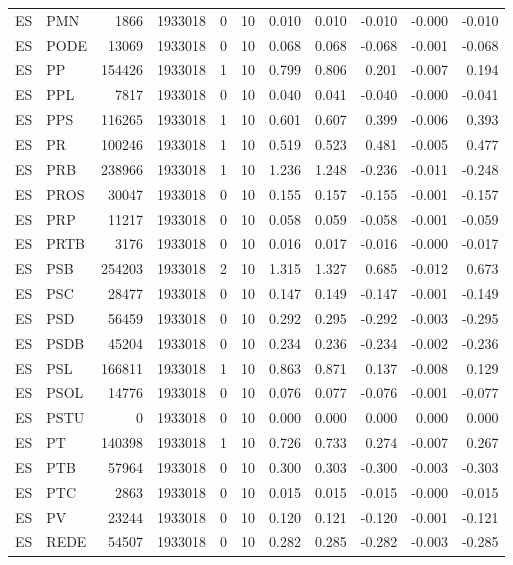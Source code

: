 \begin{landscape}
\begin{longtable}{llrrrrrrrrr}
ES & PMN & 1866 & 1933018 & 0 & 10 & 0.010 & 0.010 & -0.010 & -0.000 & -0.010 \\
ES & PODE & 13069 & 1933018 & 0 & 10 & 0.068 & 0.068 & -0.068 & -0.001 & -0.068 \\
ES & PP & 154426 & 1933018 & 1 & 10 & 0.799 & 0.806 & 0.201 & -0.007 & 0.194 \\
ES & PPL & 7817 & 1933018 & 0 & 10 & 0.040 & 0.041 & -0.040 & -0.000 & -0.041 \\
ES & PPS & 116265 & 1933018 & 1 & 10 & 0.601 & 0.607 & 0.399 & -0.006 & 0.393 \\
ES & PR & 100246 & 1933018 & 1 & 10 & 0.519 & 0.523 & 0.481 & -0.005 & 0.477 \\
ES & PRB & 238966 & 1933018 & 1 & 10 & 1.236 & 1.248 & -0.236 & -0.011 & -0.248 \\
ES & PROS & 30047 & 1933018 & 0 & 10 & 0.155 & 0.157 & -0.155 & -0.001 & -0.157 \\
ES & PRP & 11217 & 1933018 & 0 & 10 & 0.058 & 0.059 & -0.058 & -0.001 & -0.059 \\
ES & PRTB & 3176 & 1933018 & 0 & 10 & 0.016 & 0.017 & -0.016 & -0.000 & -0.017 \\
ES & PSB & 254203 & 1933018 & 2 & 10 & 1.315 & 1.327 & 0.685 & -0.012 & 0.673 \\
ES & PSC & 28477 & 1933018 & 0 & 10 & 0.147 & 0.149 & -0.147 & -0.001 & -0.149 \\
ES & PSD & 56459 & 1933018 & 0 & 10 & 0.292 & 0.295 & -0.292 & -0.003 & -0.295 \\
ES & PSDB & 45204 & 1933018 & 0 & 10 & 0.234 & 0.236 & -0.234 & -0.002 & -0.236 \\
ES & PSL & 166811 & 1933018 & 1 & 10 & 0.863 & 0.871 & 0.137 & -0.008 & 0.129 \\
ES & PSOL & 14776 & 1933018 & 0 & 10 & 0.076 & 0.077 & -0.076 & -0.001 & -0.077 \\
ES & PSTU & 0 & 1933018 & 0 & 10 & 0.000 & 0.000 & 0.000 & 0.000 & 0.000 \\
ES & PT & 140398 & 1933018 & 1 & 10 & 0.726 & 0.733 & 0.274 & -0.007 & 0.267 \\
ES & PTB & 57964 & 1933018 & 0 & 10 & 0.300 & 0.303 & -0.300 & -0.003 & -0.303 \\
ES & PTC & 2863 & 1933018 & 0 & 10 & 0.015 & 0.015 & -0.015 & -0.000 & -0.015 \\
ES & PV & 23244 & 1933018 & 0 & 10 & 0.120 & 0.121 & -0.120 & -0.001 & -0.121 \\
ES & REDE & 54507 & 1933018 & 0 & 10 & 0.282 & 0.285 & -0.282 & -0.003 & -0.285 \\

\end{longtable}
\end{landscape}
